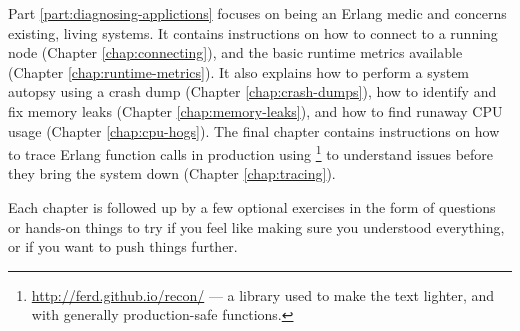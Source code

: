 Part \ref{part:diagnosing-applictions} focuses on being an Erlang medic and concerns existing, living systems. It contains instructions on how to connect to a running node (Chapter \ref{chap:connecting}), and the basic runtime metrics available (Chapter \ref{chap:runtime-metrics}). It also explains how to perform a system autopsy using a crash dump (Chapter \ref{chap:crash-dumps}), how to identify and fix memory leaks (Chapter \ref{chap:memory-leaks}), and how to find runaway CPU usage (Chapter \ref{chap:cpu-hogs}). The final chapter contains instructions on how to trace Erlang function calls in production using \footnote{\href{http://ferd.github.io/recon/}{http://ferd.github.io/recon/} — a library used to make the text lighter, and with generally production-safe functions.} to understand issues before they bring the system down (Chapter \ref{chap:tracing}).

Each chapter is followed up by a few optional exercises in the form of questions or hands-on things to try if you feel like making sure you understood everything, or if you want to push things further.

